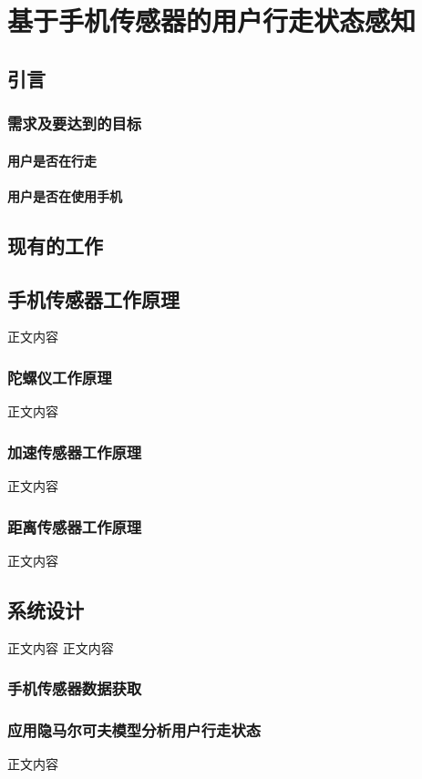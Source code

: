 \chapter{基于手机传感器的用户行走状态感知}

\section{引言}
\subsection{需求及要达到的目标}
\subsubsection{用户是否在行走}
\subsubsection{用户是否在使用手机}
\section{现有的工作}

\section{手机传感器工作原理}
正文内容
\subsection{陀螺仪工作原理}
正文内容
\subsection{加速传感器工作原理}
正文内容
\subsection{距离传感器工作原理}
正文内容

\section{系统设计}
正文内容
正文内容
\subsection{手机传感器数据获取}

\subsection{应用隐马尔可夫模型分析用户行走状态}
正文内容
